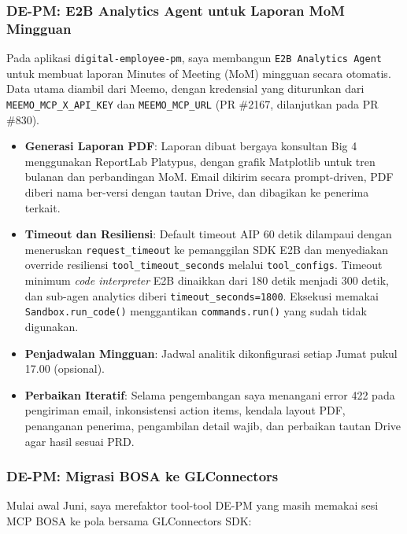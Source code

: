 \subsubsection{DE-PM: E2B Analytics Agent untuk Laporan MoM Mingguan}

Pada aplikasi \texttt{digital-employee-pm}, saya membangun \texttt{E2B Analytics Agent} untuk membuat laporan Minutes of Meeting (MoM) mingguan secara otomatis. Data utama diambil dari Meemo, dengan kredensial yang diturunkan dari \texttt{MEEMO\_MCP\_X\_API\_KEY} dan \texttt{MEEMO\_MCP\_URL} (PR \#2167, dilanjutkan pada PR \#830).

\begin{itemize}
    \item \textbf{Generasi Laporan PDF}: Laporan dibuat bergaya konsultan Big 4 menggunakan ReportLab Platypus, dengan grafik Matplotlib untuk tren bulanan dan perbandingan MoM. Email dikirim secara prompt-driven, PDF diberi nama ber-versi dengan tautan Drive, dan dibagikan ke penerima terkait.
    \item \textbf{Timeout dan Resiliensi}: Default timeout AIP 60 detik dilampaui dengan meneruskan \texttt{request\_timeout} ke pemanggilan SDK E2B dan menyediakan override resiliensi \texttt{tool\_timeout\_seconds} melalui \texttt{tool\_configs}. Timeout minimum \textit{code interpreter} E2B dinaikkan dari 180 detik menjadi 300 detik, dan sub-agen analytics diberi \texttt{timeout\_seconds=1800}. Eksekusi memakai \texttt{Sandbox.run\_code()} menggantikan \texttt{commands.run()} yang sudah tidak digunakan.
    \item \textbf{Penjadwalan Mingguan}: Jadwal analitik dikonfigurasi setiap Jumat pukul 17.00 (opsional).
    \item \textbf{Perbaikan Iteratif}: Selama pengembangan saya menangani error 422 pada pengiriman email, inkonsistensi action items, kendala layout PDF, penanganan penerima, pengambilan detail wajib, dan perbaikan tautan Drive agar hasil sesuai PRD.
\end{itemize}

\subsubsection{DE-PM: Migrasi BOSA ke GLConnectors}

Mulai awal Juni, saya merefaktor tool-tool DE-PM yang masih memakai sesi MCP BOSA ke pola bersama GLConnectors SDK:

